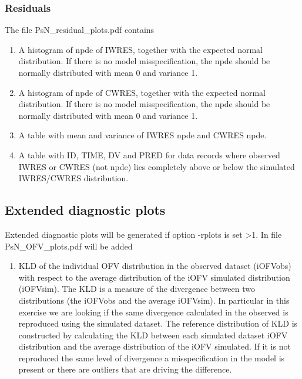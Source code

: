 \subsubsection{Residuals}
\noindent The file PsN\_residual\_plots.pdf contains
\begin{enumerate}
\item A histogram of npde of IWRES, together with the expected normal distribution. If there is no model misspecification, the npde should be normally distributed with mean 0 and variance 1.
\item A histogram of npde of CWRES, together with the expected normal distribution. If there is no model misspecification, the npde should be normally distributed with mean 0 and variance 1.
\item A table with mean and variance of IWRES npde and CWRES npde.
\item A table with ID, TIME, DV and PRED for data records where observed IWRES or CWRES (not npde) lies completely above or below the simulated IWRES/CWRES distribution.
\end{enumerate}


\subsection{Extended diagnostic plots}
Extended diagnostic plots will be generated if option -rplots is set >1. In file PsN\_OFV\_plots.pdf will be added
\begin{enumerate}
\item KLD of the individual OFV distribution in the observed dataset (iOFVobs) with respect to the average distribution of the iOFV simulated distribution (iOFVsim). The KLD is a measure of the divergence between two distributions (the iOFVobs and the average iOFVsim). In particular in this exercise we are looking if the same divergence calculated in the observed is reproduced using the simulated dataset. The reference distribution of KLD is constructed by calculating the KLD between each simulated dataset iOFV distribution and the average distribution of the iOFV simulated. If it is not reproduced the same level of divergence a misspecification in the model is present or there are outliers that are driving the difference. 

\end{enumerate}

